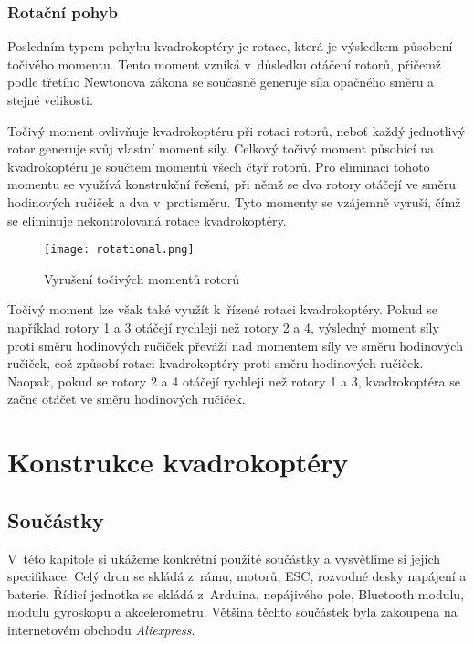 \documentclass[12pt]{report}
\begin{document}
\section[Rotační pohyb]{Rotační pohyb}
Posledním typem pohybu kvadrokoptéry je rotace, která je výsledkem působení točivého momentu. Tento moment vzniká v~důsledku otáčení rotorů, přičemž podle třetího Newtonova zákona se současně generuje síla opačného směru a stejné velikosti.

Točivý moment ovlivňuje kvadrokoptéru při rotaci rotorů, neboť každý jednotlivý rotor generuje svůj vlastní moment síly. Celkový točivý moment působící na kvadrokoptéru je součtem momentů všech čtyř rotorů. Pro eliminaci tohoto momentu se využívá konstrukční řešení, při němž se dva rotory otáčejí ve směru hodinových ručiček a dva v~protisměru. Tyto momenty se vzájemně vyruší, čímž se eliminuje nekontrolovaná rotace kvadrokoptéry.

\begin{figure}[H]
	\centering
	\texttt{[image: rotational.png]}
	\caption{Vyrušení točivých momentů rotorů \cite{nasa}}
	\label{fig:rotational.png}
\end{figure}

Točivý moment lze však také využít k~řízené rotaci kvadrokoptéry. Pokud se například rotory 1 a 3 otáčejí rychleji než rotory 2 a 4, výsledný moment síly proti směru hodinových ručiček převáží nad momentem síly ve směru hodinových ručiček, což způsobí rotaci kvadrokoptéry proti směru hodinových ručiček. Naopak, pokud se rotory 2 a 4 otáčejí rychleji než rotory 1 a 3, kvadrokoptéra se začne otáčet ve směru hodinových ručiček. \cite{nasa} \cite{ca}
\part{Konstrukce kvadrokoptéry} %

\chapter[Součástky]{Součástky}
V~této kapitole si ukážeme konkrétní použité součástky a vysvětlíme si jejich specifikace. Celý dron se skládá z~rámu, motorů, ESC, rozvodné desky napájení a baterie. Řídicí jednotka se skládá z~Arduina, nepájivého pole, Bluetooth modulu, modulu gyroskopu a akcelerometru. Většina těchto součástek byla zakoupena na internetovém obchodu \textit{Aliexpress}.
\end{document}

